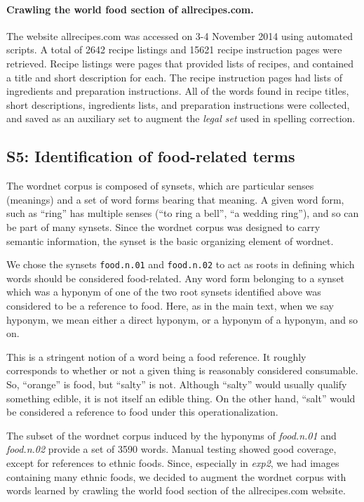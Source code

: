 \documentclass[12pt]{article}
\begin{document}
	\paragraph{Crawling the world food section of allrecipes.com.}
	The website allrecipes.com was accessed on 3-4 November 2014 using 
	automated scripts.  A total of 2642 recipe listings and 15621 recipe
	instruction pages were retrieved.  Recipe listings were pages that 
	provided lists of recipes, and contained a title and short description 
	for each.  
	The recipe instruction pages had lists of ingredients and preparation 
	instructions.  All of the words found in recipe titles, short
	descriptions, ingredients lists, and preparation instructions were
	collected, and saved as an auxiliary set to augment the \textit{legal set}
	used in spelling correction.
	


\subsection*{S5: Identification of food-related terms}
The wordnet corpus is composed of synsets, which are particular senses 
(meanings) and a set of word forms bearing that meaning. A given word form, 
such as ``ring'' has multiple senses (``to ring a bell'', ``a wedding ring''), 
and so can be part of many synsets.  Since the wordnet corpus was designed
to carry semantic information, the synset is the basic organizing element
of wordnet.

We chose the synsets \texttt{food.n.01} and \texttt{food.n.02} to act as roots
in defining which words should be considered food-related.  Any word form
belonging to a synset which was a hyponym of one of the two root synsets
identified above was considered to be a reference to food.  Here, as in the
main text, when we say hyponym, we mean either a direct hyponym, or a hyponym
of a hyponym, and so on.

This is a stringent notion of a word being a food reference.  It roughly
corresponds to whether or not a given thing is reasonably considered 
consumable.  So, ``orange'' is food, but ``salty'' is not.  Although ``salty''
would usually qualify something edible, it is not itself an edible thing.
On the other hand, ``salt'' would be considered a reference to food under 
this operationalization.

The subset of the wordnet corpus induced by the hyponyms of \textit{food.n.01}
and \textit{food.n.02} provide a set of 3590 words.  Manual
testing showed good coverage, except for references to ethnic foods.  
Since, especially in \textit{exp2}, we had images containing many ethnic 
foods, we decided to augment the wordnet corpus with words learned by 
crawling the world food section of the allrecipes.com website.  
\end{document}
